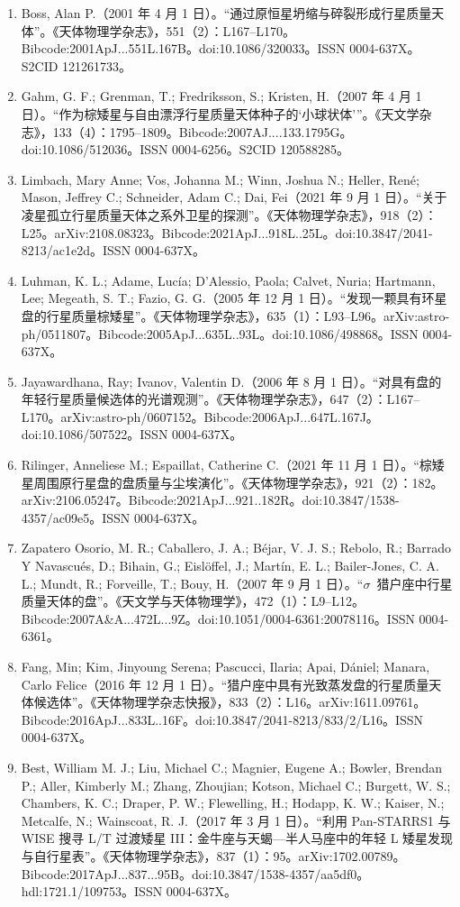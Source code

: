 \begin{enumerate}
\item Boss, Alan P.（2001 年 4 月 1 日）。“通过原恒星坍缩与碎裂形成行星质量天体”。《天体物理学杂志》，551（2）：L167--L170。Bibcode:2001ApJ...551L.167B。doi:10.1086/320033。ISSN 0004-637X。S2CID 121261733。  
\item Gahm, G. F.; Grenman, T.; Fredriksson, S.; Kristen, H.（2007 年 4 月 1 日）。“作为棕矮星与自由漂浮行星质量天体种子的‘小球状体’”。《天文学杂志》，133（4）：1795--1809。Bibcode:2007AJ....133.1795G。doi:10.1086/512036。ISSN 0004-6256。S2CID 120588285。  
\item Limbach, Mary Anne; Vos, Johanna M.; Winn, Joshua N.; Heller, René; Mason, Jeffrey C.; Schneider, Adam C.; Dai, Fei（2021 年 9 月 1 日）。“关于凌星孤立行星质量天体之系外卫星的探测”。《天体物理学杂志》，918（2）：L25。arXiv:2108.08323。Bibcode:2021ApJ...918L..25L。doi:10.3847/2041-8213/ac1e2d。ISSN 0004-637X。  
\item Luhman, K. L.; Adame, Lucía; D'Alessio, Paola; Calvet, Nuria; Hartmann, Lee; Megeath, S. T.; Fazio, G. G.（2005 年 12 月 1 日）。“发现一颗具有环星盘的行星质量棕矮星”。《天体物理学杂志》，635（1）：L93--L96。arXiv:astro-ph/0511807。Bibcode:2005ApJ...635L..93L。doi:10.1086/498868。ISSN 0004-637X。  
\item Jayawardhana, Ray; Ivanov, Valentin D.（2006 年 8 月 1 日）。“对具有盘的年轻行星质量候选体的光谱观测”。《天体物理学杂志》，647（2）：L167--L170。arXiv:astro-ph/0607152。Bibcode:2006ApJ...647L.167J。doi:10.1086/507522。ISSN 0004-637X。  
\item Rilinger, Anneliese M.; Espaillat, Catherine C.（2021 年 11 月 1 日）。“棕矮星周围原行星盘的盘质量与尘埃演化”。《天体物理学杂志》，921（2）：182。arXiv:2106.05247。Bibcode:2021ApJ...921..182R。doi:10.3847/1538-4357/ac09e5。ISSN 0004-637X。  
\item Zapatero Osorio, M. R.; Caballero, J. A.; Béjar, V. J. S.; Rebolo, R.; Barrado Y Navascués, D.; Bihain, G.; Eislöffel, J.; Martín, E. L.; Bailer-Jones, C. A. L.; Mundt, R.; Forveille, T.; Bouy, H.（2007 年 9 月 1 日）。“$\sigma$~猎户座中行星质量天体的盘”。《天文学与天体物理学》，472（1）：L9--L12。Bibcode:2007A\&A...472L...9Z。doi:10.1051/0004-6361:20078116。ISSN 0004-6361。  
\item Fang, Min; Kim, Jinyoung Serena; Pascucci, Ilaria; Apai, Dániel; Manara, Carlo Felice（2016 年 12 月 1 日）。“猎户座中具有光致蒸发盘的行星质量天体候选体”。《天体物理学杂志快报》，833（2）：L16。arXiv:1611.09761。Bibcode:2016ApJ...833L..16F。doi:10.3847/2041-8213/833/2/L16。ISSN 0004-637X。  
\item Best, William M. J.; Liu, Michael C.; Magnier, Eugene A.; Bowler, Brendan P.; Aller, Kimberly M.; Zhang, Zhoujian; Kotson, Michael C.; Burgett, W. S.; Chambers, K. C.; Draper, P. W.; Flewelling, H.; Hodapp, K. W.; Kaiser, N.; Metcalfe, N.; Wainscoat, R. J.（2017 年 3 月 1 日）。“利用 Pan-STARRS1 与 WISE 搜寻 L/T 过渡矮星 III：金牛座与天蝎—半人马座中的年轻 L 矮星发现与自行星表”。《天体物理学杂志》，837（1）：95。arXiv:1702.00789。Bibcode:2017ApJ...837...95B。doi:10.3847/1538-4357/aa5df0。hdl:1721.1/109753。ISSN 0004-637X。  

\end{enumerate}
